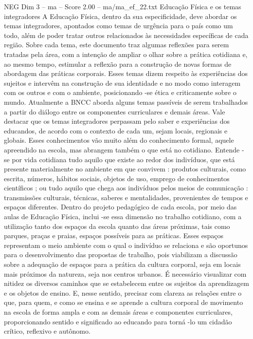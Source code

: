 \begin{textsample}{NEG Dim 3 – ma – Score 2.00 – ma/ma\_ef\_22.txt}  \label{ex:f3_neg_150}
Educação Física e os temas integradores A Educação Física, dentro da sua especificidade, deve abordar os temas integradores, apontados como temas de urgência para o país como um todo, além de poder tratar outros relacionados às necessidades específicas de cada região.
Sobre cada tema, este documento traz algumas reflexões para serem tratadas pela área, com a intenção de ampliar o olhar sobre a prática cotidiana e, ao mesmo tempo, estimular a reflexão para a construção de novas formas de abordagem das práticas corporais.
Esses temas dizem respeito às experiências dos sujeitos e intervêm na construção de sua identidade e no modo como interagem com os outros e com o ambiente, posicionando -se ética e criticamente sobre o mundo.
Atualmente a BNCC aborda alguns temas passíveis de serem trabalhados a partir do diálogo entre os componentes curriculares e demais áreas.
Vale destacar que os temas integradores perpassam pelo saber e experiências dos educandos, de acordo com o contexto de cada um, sejam locais, regionais e globais.
Esses conhecimentos vão muito além do conhecimento formal, aquele apreendido na escola, mas abrangem também o que está no cotidiano.
Entende -se por vida cotidiana tudo aquilo que existe ao redor dos indivíduos, que está presente materialmente no ambiente em que convivem : produtos culturais, como escrita, números, hábitos sociais, objetos de uso, emprego de conhecimentos científicos ; ou tudo aquilo que chega aos indivíduos pelos meios de comunicação : transmissões culturais, técnicas, saberes e mentalidades, provenientes de tempos e espaços diferentes.
Dentro do projeto pedagógico de cada escola, por meio das aulas de Educação Física, inclui -se essa dimensão no trabalho cotidiano, com a utilização tanto dos espaços da escola quanto das áreas próximas, tais como parques, praças e praias, espaços possíveis para as práticas.
Esses espaços representam o meio ambiente com o qual o indivíduo se relaciona e são oportunos para o desenvolvimento das propostas de trabalho, pois viabilizam a discussão sobre a adequação de espaços para a prática da cultura corporal, seja em locais mais próximos da natureza, seja nos centros urbanos.
É necessário visualizar com nitidez os diversos caminhos que se estabelecem entre os sujeitos da aprendizagem e os objetos de ensino.
E, nesse sentido, precisar com clareza as relações entre o que, para quem, e como se ensina e se aprende a cultura corporal de movimento na escola de forma ampla e com as demais áreas e componentes curriculares, proporcionando sentido e significado ao educando para torná -lo um cidadão crítico, reflexivo e autônomo.

\end{textsample}
